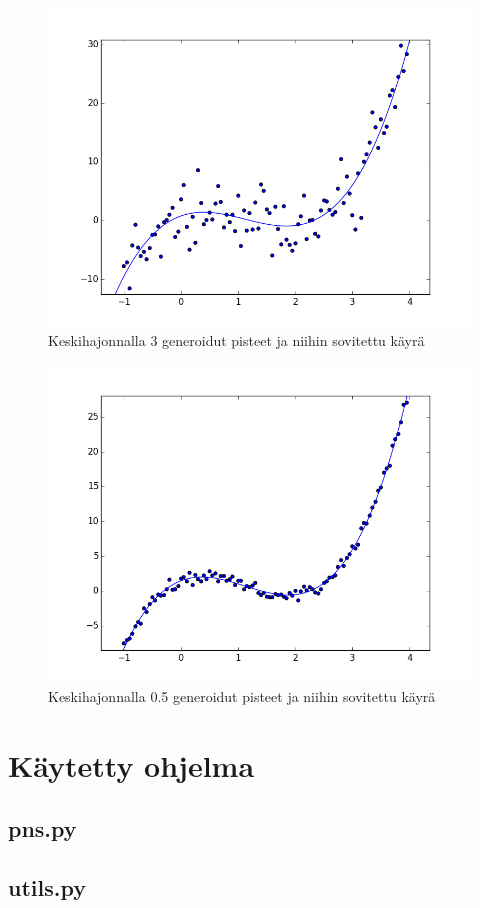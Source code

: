 \documentclass[12pt,a4paper,titlepage]{article}
\begin{document}
\begin{figure}
\centering
\includegraphics[width=\textwidth]{python/keskihajonta3.png}
\caption{Keskihajonnalla 3 generoidut pisteet ja niihin sovitettu käyrä}
\label{keskihajonta3}
\end{figure}

\begin{figure}
\centering
\includegraphics[width=\textwidth]{python/keskihajonta05.png}
\caption{Keskihajonnalla 0.5 generoidut pisteet ja niihin sovitettu käyrä}
\label{keskihajonta05}
\end{figure}


\newpage

 
\appendix
\newpage
\section{Käytetty ohjelma} \label{koodi}
\subsection{pns.py} \label{pns}

\newpage
\subsection{utils.py} \label{utils}

\end{document}
